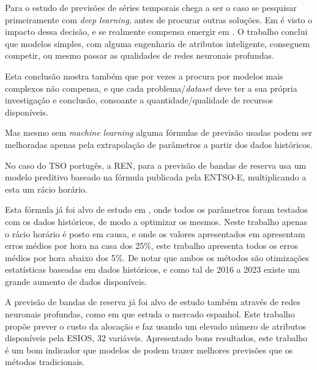 Para o estudo de previsões de séries temporais chega a ser o caso se pesquisar primeiramente com \textit{deep learning}, antes de procurar outras soluções. Em \cite{Elsayed} é visto o impacto dessa decisão, e se realmente compensa emergir em . O trabalho conclui que modelos simples, com alguma engenharia de atributos inteligente, conseguem competir, ou mesmo passar as qualidades de redes neuronais profundas.\par
Esta conclusão mostra também que por vezes a procura por modelos mais complexos não compensa, e que cada problema/\textit{dataset} deve ter a sua própria investigação e conclusão, consoante a quantidade/qualidade de recursos disponíveis.\par
Mas mesmo sem \textit{machine learning} alguma fórmulas de previsão usadas podem ser melhoradas apenas pela extrapolação de parâmetros a partir dos dados históricos.\par  
No caso do \gls{TSO} portugês, a \gls{REN}, para a previsão de bandas de reserva usa um modelo preditivo baseado na fórmula publicada pela \gls{ENTSO-E}, multiplicando a esta um rácio horário.\par
Esta fórmula já foi alvo de estudo em \cite{Carneiro2016}, onde todos os parâmetros foram testados com os dados históricos, de modo a optimizar os mesmos. Neste trabalho apenas o rácio horário é posto em causa, e onde os valores apresentados em \cite{Carneiro2016} apresentam erros médios por hora na casa dos 25\%, este trabalho apresenta todos os erros médios por hora abaixo dos 5\%. De notar que ambos os métodos são otimizações estatísticas baseadas em dados históricos, e como tal de 2016 a 2023 existe um grande aumento de dados disponíveis.\par
A previsão de bandas de reserva já foi alvo de estudo também através de redes neuronais profundas, como em \cite{miota2023} que estuda o mercado espanhol. Este trabalho propõe prever o custo da alocação e faz usando um elevado número de atributos disponíveis pela \gls{ESIOS}, 32 variáveis. Apresentado bons resultados, este trabalho é um bom indicador que modelos de  podem trazer melhores previsões que os métodos tradicionais.\par


